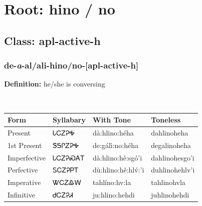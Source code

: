 \needspace{4in}
\section*{Root: hino / no}
\nopagebreak
{}
\needspace{3in}
\subsection*{Class: apl-active-h}
\nopagebreak
\needspace{2in}
\subsubsection*{de{-}\textit{a}{-}al/ali{-}\textbf{hino/no}{-}[apl-active-h]}
\nopagebreak
\textbf{Definition: } he/she is conversing
\\[0.5em]
\begin{tabularx}{\textwidth}{l X X X}%
\toprule%
\textbf{Form}&\textbf{Syllabary}&\textbf{With Tone}&\textbf{Toneless}\\%
\midrule%
Present&ᏓᏟᏃᎮᎭ&dà:hlino:héha&dahlinoheha\\%
1st Present&ᏕᎦᎵᏃᎮᎭ&de:gálì:no:héha&degalinoheha\\%
Imperfective&ᏓᏟᏃᎮᏍᎪᎢ&dà:hlino:hě:sgó’i&dahlinohesgo’i\\%
Perfective&ᏚᏟᏃᎮᏢᎢ&dù:hlino:hě:hlv́:’i&duhlinohehlv’i\\%
Imperative&ᏔᏟᏃᎲᎳ&tahlíno:hv:la&tahlinohvla\\%
Infinitive&ᏧᏟᏃᎮᏗ&ju:hlino:hehdi&juhlinohehdi\\%
\bottomrule%
\end{tabularx}
\\[1em]